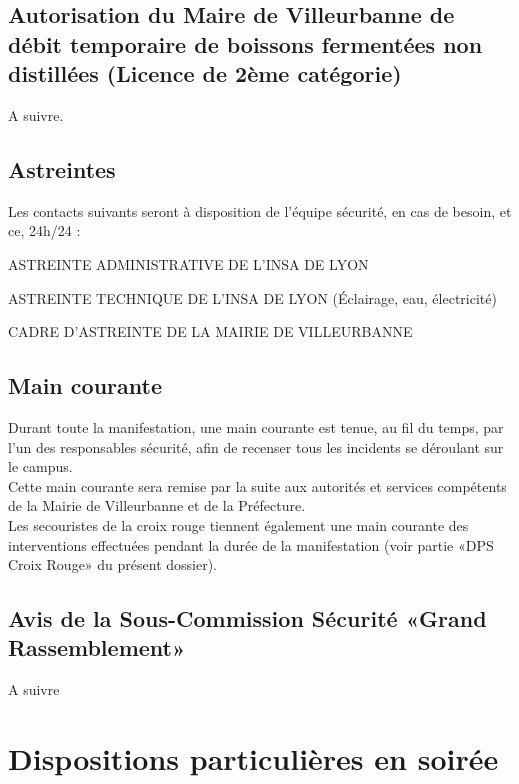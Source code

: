 \documentclass[hidelinks, paper=a4, fontsize=13pt]{report}
\begin{document}
\subsection{Autorisation du Maire de Villeurbanne de débit temporaire de boissons fermentées non distillées (Licence de 2ème catégorie)}
A suivre.

\subsection{Astreintes}


Les contacts suivants seront à disposition de l’équipe sécurité, en cas de besoin, et ce, 24h/24 : 
\begin{list}{•}{}
	\item ASTREINTE ADMINISTRATIVE DE L’INSA DE LYON 
	\item ASTREINTE TECHNIQUE DE L’INSA DE LYON (Éclairage, eau, électricité)
	\item CADRE D’ASTREINTE DE LA MAIRIE DE VILLEURBANNE
\end{list}

\subsection{Main courante}

Durant toute la manifestation, une main courante est tenue, au fil du temps, par l’un des responsables sécurité, afin de recenser tous les incidents se déroulant sur le campus.\\

Cette main courante sera remise par la suite aux autorités et services compétents de la Mairie de Villeurbanne et de la Préfecture.\\

Les secouristes de la croix rouge tiennent également une main courante des interventions effectuées pendant la durée de la manifestation (voir partie «DPS Croix Rouge» du présent dossier).

\subsection{Avis de la Sous-Commission Sécurité «Grand Rassemblement»}

A suivre
\newpage

\section{Dispositions particulières en soirée}
\end{document}
